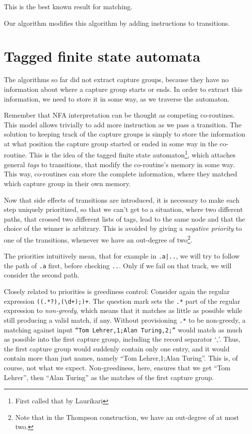 \documentclass[11pt,a4paper,twoside,openright]{Thesis}
\theoremstyle{definition}
\newcommand{\seclabel}[1]{\label{sec:#1}}
\begin{document}
This is the best known result for matching\cite{Cox07a,Cox09a,Cox10a}.

Our algorithm modifies this algorithm by adding instructions to transitions.

\section{Tagged finite state automata}\seclabel{tfsa}
The algorithms so far did not extract capture groups, because they have no
information about where a capture group starts or ends. In order to extract
this information, we need to store it in some way, as we traverse the
automaton.

Remember that NFA interpretation can be thought as competing co-routines.
This model allows trivially to add more instruction as we pass a transition.
The solution to keeping track of the capture groups is simply to store the
information at what position the capture group started or ended in some way in
the co-routine. This is the idea of the tagged finite state
automaton\footnote{First called that by Laurikari\cite{Laur00a}}, which
attaches general \emph{tags} to transitions, that modify the co-routine's
memory in some way. This way, co-routines can store the complete information,
where they matched which capture group in their own memory.

Now that side effects of transitions are introduced, it is necessary to make
each step uniquely prioritized, so that we can't get to a situation, where
two different paths, that crossed two different lists of tags, lead to the
same node and that the choice of the winner is arbitrary. This is avoided by
giving a \emph{negative priority} to one of the transitions, whenever we have
an out-degree of two\footnote{Note that in the Thompson construction, we have
an out-degree of at most two.}.

The priorities intuitively mean, that for example in \texttt{.a|..}, we will
try to follow the path of \texttt{.a} first, before checking \texttt{..}.
Only if we fail on that track, we will consider the second path.

Closely related to priorities is greediness control: Consider again the regular
expression \texttt{((.*?),(\textbackslash{}d+);)+}. The question mark sets the
\texttt{.*} part of the regular expression to \emph{non-greedy}, which means
that it matches as little as possible while still producing a valid match, if
any.  Without provisioning \texttt{.*} to be non-greedy, a matching against
input \texttt{``Tom Lehrer,1;Alan Turing,2;''} would match as much as possible
into the first capture group, including the record separator `,'.  Thus, the
first capture group would suddenly contain only one entry, and it would contain
more than just names, namely ``Tom Lehrer,1;Alan Turing''.  This is, of course,
not what we expect.  Non-greediness, here, ensures that we get ``Tom Lehrer'',
then ``Alan Turing'' as the matches of the first capture group.
\end{document}
